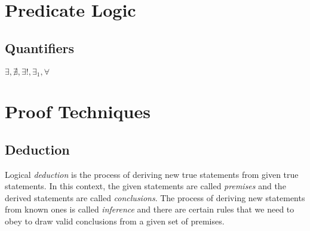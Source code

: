 

\section{Predicate Logic}



\subsection{Quantifiers}

$\exists, \nexists, \exists!, \exists_1, \forall$



\section{Proof Techniques}



\subsection{Deduction}
Logical \emph{deduction} is the process of deriving new true statements from given true statements. In this context, the given statements are called \emph{premises} and the derived statements are called \emph{conclusions}. The process of deriving new statements from known ones is called \emph{inference} and there are certain rules that we need to obey to draw valid conclusions from a given set of premises.

